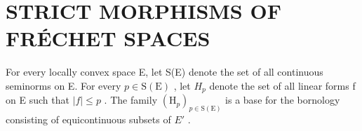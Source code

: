\section{STRICT MORPHISMS OF FRÉCHET SPACES}

For every locally convex space E, let S(E) denote the set of all continuous seminorms on E. For every \(p \in \mathrm{S}(\mathrm{E})\) , let \(H_{p}\) denote the set of all linear forms f on E such that \(|f| \leqslant p\) . The family \((\mathrm{H}_{p})_{p \in \mathrm{S}(\mathrm{E})}\) is a base for the bornology consisting of equicontinuous subsets of \(E'\) .

